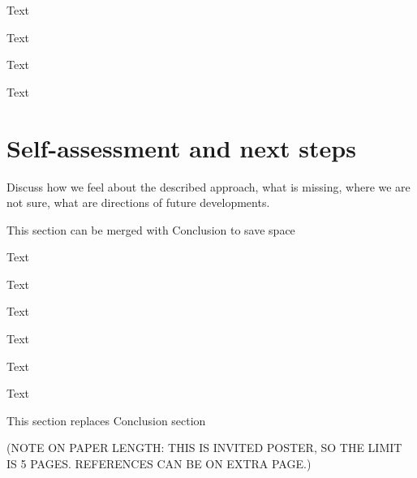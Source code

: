 \documentclass[%
               refpage       %
               hyphens,      %
               ]{jacow}
\begin{document}
Text 

Text 

Text 

Text 

 

\section{Self-assessment and next steps}

Discuss how we feel about the described approach, what is missing, where we are not sure, what are directions of future developments. 

This section can be merged with Conclusion to save space 

Text 

Text 

Text

Text

Text

Text 

This section replaces Conclusion section

(NOTE ON PAPER LENGTH: THIS IS INVITED POSTER, SO THE LIMIT IS 5 PAGES. REFERENCES CAN BE ON EXTRA PAGE.)
 







 
 
\end{document}
